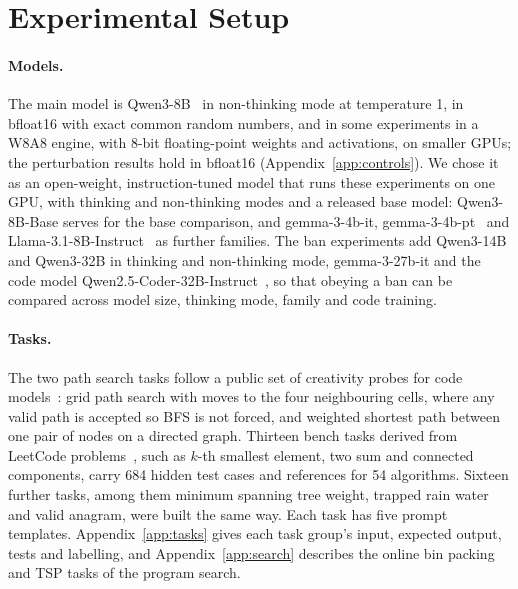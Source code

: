 \documentclass[11pt,letterpaper]{article}
\begin{document}
\section{Experimental Setup}
\label{sec:setup}

\paragraph{Models.} The main model is Qwen3-8B~\citep{Yang2025} in non-thinking mode at temperature 1, in bfloat16 with exact common random numbers, and in some experiments in a W8A8 engine, with 8-bit floating-point weights and activations, on smaller GPUs; the perturbation results hold in bfloat16 (Appendix~\ref{app:controls}). We chose it as an open-weight, instruction-tuned model that runs these experiments on one GPU, with thinking and non-thinking modes and a released base model: Qwen3-8B-Base serves for the base comparison, and gemma-3-4b-it, gemma-3-4b-pt~\citep{Team2025} and Llama-3.1-8B-Instruct~\citep{Grattafiori2024} as further families. The ban experiments add Qwen3-14B and Qwen3-32B in thinking and non-thinking mode, gemma-3-27b-it and the code model Qwen2.5-Coder-32B-Instruct~\citep{Qwen2024}, so that obeying a ban can be compared across model size, thinking mode, family and code training.

\paragraph{Tasks.} The two path search tasks follow a public set of creativity probes for code models~\citep{Pesjak2026}: grid path search with moves to the four neighbouring cells, where any valid path is accepted so BFS is not forced, and weighted shortest path between one pair of nodes on a directed graph. Thirteen bench tasks derived from LeetCode problems~\citep{Xia2025}, such as $k$-th smallest element, two sum and connected components, carry 684 hidden test cases and references for 54 algorithms. Sixteen further tasks, among them minimum spanning tree weight, trapped rain water and valid anagram, were built the same way. Each task has five prompt templates. Appendix~\ref{app:tasks} gives each task group's input, expected output, tests and labelling, and Appendix~\ref{app:search} describes the online bin packing and TSP tasks of the program search.
\end{document}
